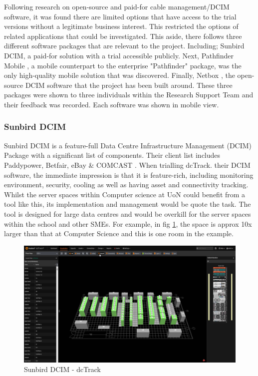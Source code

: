 \documentclass [11pt,a4paper]{article}
\begin{document}
Following research on open-source and paid-for cable management/DCIM software, it was found there are limited options that have access to the trial versions without a legitimate business interest. This restricted the options of related applications that could be investigated. This aside, there follows three different software packages that are relevant to the project. Including; Sunbird DCIM\cite{Sunbird}, a paid-for solution with a trial accessible publicly. Next, Pathfinder Mobile \cite{Pathfinder}, a mobile counterpart to the enterprise "Pathfinder" package, was the only high-quality mobile solution that was discovered. Finally, Netbox \cite{Netbox}, the open-source DCIM software that the project has been built around. These three packages were shown to three individuals within the Research Support Team and their feedback was recorded. Each software was shown in mobile view. 

\subsubsection{Sunbird DCIM}
\label{sec:sunbird}
Sunbird DCIM is a feature-full Data Centre Infrastructure Management (DCIM) Package with a significant list of components. Their client list includes Paddypower, Betfair, eBay \& COMCAST \cite{Sunbird-we-know-data-centres}. When trialling dcTrack. their DCIM software, the immediate impression is that it is feature-rich, including monitoring environment, security, cooling as well as having asset and connectivity tracking. Whilst the server spaces within Computer science at UoN could benefit from a tool like this, its implementation and management would be quote the task. The tool is designed for large data centres and would be overkill for the server spaces within the school and other SMEs. For example, in fig \ref{fig:sunbird_dcTrack}, the space is approx 10x larger than that at Computer Science and this is one room in the example. 

\begin{figure}[H]
    \centering
    \includegraphics[width=0.8\linewidth]{images/sunbirddcim.png}
    \caption{Sunbird DCIM - dcTrack}
    \label{fig:sunbird_dcTrack}
\end{figure}
\end{document}
